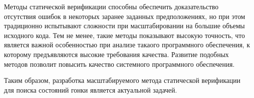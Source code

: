 Методы статической верификации способны обеспечить доказательство отсутствия ошибок в некоторых заранее заданных предположениях, но при этом традиционно испытывают сложности при масштабировании на большие объемы исходного кода.
Тем не менее, такие методы показывают высокую точность, что является важной особенностью при анализе такаого программного обеспечения, к которому предъявляются высокие требования качества.
Развитие подобных методов позволит повысить качество системного программного обеспечения.

Таким образом, разработка масштабируемого метода статической верификации для поиска состояний гонки является актуальной задачей.

%
%

